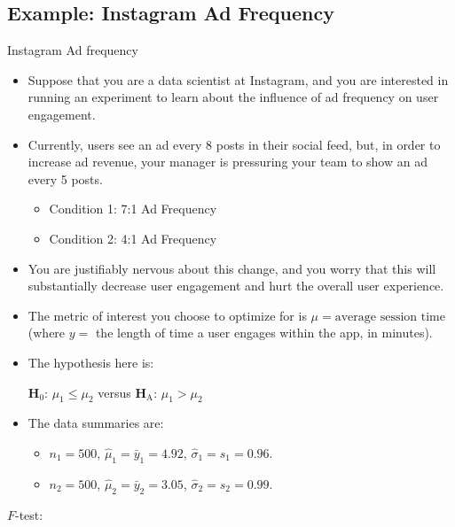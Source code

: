 \subsection{Example: Instagram Ad Frequency}
\begin{Example}{Instagram Ad frequency}{}
    \begin{itemize}
        \item Suppose that you are a data scientist at Instagram, and you are interested
              in running an experiment to learn about the influence of ad frequency on user engagement.
        \item Currently, users see an ad every 8 posts in their social feed, but, in order
              to increase ad revenue, your manager is pressuring your team to show an ad every 5 posts.
              \begin{itemize}
                  \item Condition 1: 7:1 Ad Frequency
                  \item Condition 2: 4:1 Ad Frequency
              \end{itemize}
        \item You are justifiably nervous about this change, and you worry that this
              will substantially decrease user engagement and hurt the overall user experience.
        \item The metric of interest you choose to optimize for is $ \mu=\text{average session time} $
              (where $ y =$ the length of time a user engages within the app, in minutes).
        \item The hypothesis here is:
              \begin{tightcenter}
                  $ \mathbf{H}_0 $: $ \mu_1\le \mu_2 $ versus $ \mathbf{H}_\text{A} $: $ \mu_1>\mu_2 $
              \end{tightcenter}
        \item The data summaries are:
              \begin{itemize}
                  \item $ n_1=500 $, $ \hat{\mu}_1=\bar{y}_1=4.92 $, $ \hat{\sigma}_1=s_1=0.96 $.
                  \item $ n_2=500 $, $ \hat{\mu}_2=\bar{y}_2=3.05 $, $ \hat{\sigma}_2=s_2=0.99 $.
              \end{itemize}
    \end{itemize}
    \begin{framed}
        $ F $-test:
        \begin{itemize}

\end{itemize}
\end{framed}
\end{Example}
